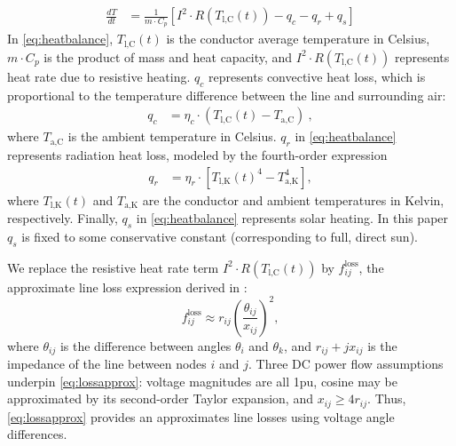 \documentclass[journal,twoside]{IEEEtran}
\begin{document}
\begin{align}\label{eq:heatbalance}
\frac{dT}{dt} &= \frac{1}{m\cdot C_p}\left[I^2\cdot R(T_\text{l,C}(t)) - q_c - q_r + q_s \right]
\end{align}
In \eqref{eq:heatbalance}, $T_\text{l,C}(t)$ is the conductor average temperature in Celsius, $m\cdot C_p$ is the product of mass and heat capacity, and $I^2\cdot R(T_\text{l,C}(t))$ represents heat rate due to resistive heating. $q_c$ represents convective heat loss, which is proportional to the temperature difference between the line and surrounding air:
\begin{align}\label{eq:qc}
q_c &= \eta_c\cdot(T_\text{l,C}(t) - T_\text{a,C})~,
\end{align}
where $T_\text{a,C}$ is the ambient temperature in Celsius. $q_r$ in \eqref{eq:heatbalance} represents radiation heat loss, modeled by the fourth-order expression
\begin{align}\label{eq:qr}
 q_r &= \eta_r\cdot\left[T_\text{l,K}(t)^4 - T_\text{a,K}^4\right],
\end{align}
where $T_\text{l,K}(t)$ and $T_\text{a,K}$ are the conductor and ambient temperatures in Kelvin, respectively. Finally, $q_s$ in \eqref{eq:heatbalance} represents solar heating. In this paper $q_s$ is fixed to some conservative constant (corresponding to full, direct sun).

We replace the resistive heat rate term $I^2\cdot R(T_\text{l,C}(t))$ by $f_{ij}^\text{loss}$, the approximate line loss expression derived in \cite{almassalkhi2014}:
\begin{equation}\label{eq:lossapprox}
f_{ij}^{\text{loss}} \approx r_{ij}\left(\frac{\theta_{ij}}{x_{ij}}\right)^2,
\end{equation}
where $\theta_{ij}$ is the difference between angles $\theta_i$ and $\theta_k$, and $r_{ij} +j x_{ij}$ is the impedance of the line between nodes $i$ and $j$. Three DC power flow assumptions underpin \eqref{eq:lossapprox}: voltage magnitudes are all 1pu, cosine may be approximated by its second-order Taylor expansion, and $x_{ij} \geq 4r_{ij}$. Thus, \eqref{eq:lossapprox} provides an approximates line losses using voltage angle differences.
\end{document}
